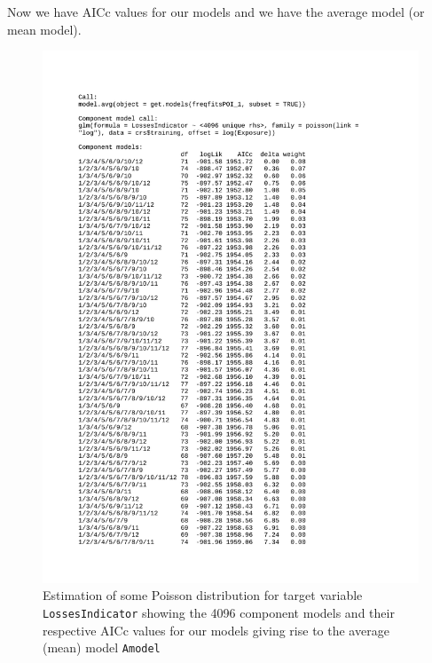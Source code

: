 \documentclass[
]{article}
\begin{document}
\normalsize

Now we have AICc values for our models and we have the average model (or
mean model).

\begin{figure}
\centering
\includegraphics[scale=1.0]{Average_model_Training_1.pdf}
\caption[]{Estimation of some Poisson distribution for target variable \texttt{LossesIndicator} showing the 4096 component models and their respective AICc values for our models giving rise to the average (mean) model \texttt{Amodel}}
\label{AModel_Summary1}
\end{figure}
\end{document}
